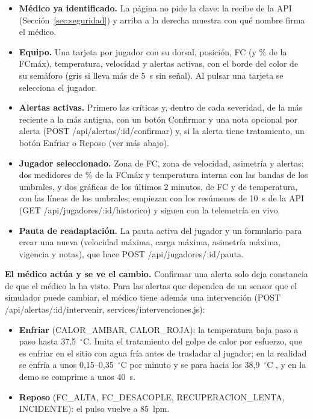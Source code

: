 \documentclass[runningheads]{llncs}
\begin{document}
\begin{itemize}
  \item \textbf{Médico ya identificado.} La página no pide la clave: la recibe de la API (Sección~\ref{sec:seguridad}) y arriba a la derecha muestra con qué nombre firma el médico.
  \item \textbf{Equipo.} Una tarjeta por jugador con su dorsal, posición, FC (y \% de la FCmáx), temperatura, velocidad y alertas activas, con el borde del color de su semáforo (gris si lleva más de 5~s sin señal). Al pulsar una tarjeta se selecciona el jugador.
  \item \textbf{Alertas activas.} Primero las críticas y, dentro de cada severidad, de la más reciente a la más antigua, con un botón Confirmar y una nota opcional por alerta (POST /api/alertas/:id/confirmar) y, si la alerta tiene tratamiento, un botón Enfriar o Reposo (ver más abajo).
  \item \textbf{Jugador seleccionado.} Zona de FC, zona de velocidad, asimetría y alertas; dos medidores de \% de la FCmáx y temperatura interna con las bandas de los umbrales, y dos gráficas de los últimos 2 minutos, de FC y de temperatura, con las líneas de los umbrales; empiezan con los resúmenes de 10~s de la API (GET /api/jugadores/:id/historico) y siguen con la telemetría en vivo.
  \item \textbf{Pauta de readaptación.} La pauta activa del jugador y un formulario para crear una nueva (velocidad máxima, carga máxima, asimetría máxima, vigencia y notas), que hace POST /api/jugadores/:id/pauta.
\end{itemize}

\textbf{El médico actúa y se ve el cambio.} Confirmar una alerta solo deja constancia de que el médico la ha visto. Para las alertas que dependen de un sensor que el simulador puede cambiar, el médico tiene además una intervención (POST /api/alertas/:id/intervenir, services/intervenciones.js):

\begin{itemize}
  \item \textbf{Enfriar} (CALOR\_AMBAR, CALOR\_ROJA): la temperatura baja paso a paso hasta 37,5~$^\circ$C. Imita el tratamiento del golpe de calor por esfuerzo, que es enfriar en el sitio con agua fría antes de trasladar al jugador; en la realidad se enfría a unos 0,15--0,35~$^\circ$C por minuto y se para hacia los 38,9~$^\circ$C \cite{nata2015}, y en la demo se comprime a unos 40~s.
  \item \textbf{Reposo} (FC\_ALTA, FC\_DESACOPLE, RECUPERACION\_LENTA, INCIDENTE): el pulso vuelve a 85~lpm.
\end{itemize}
\end{document}
